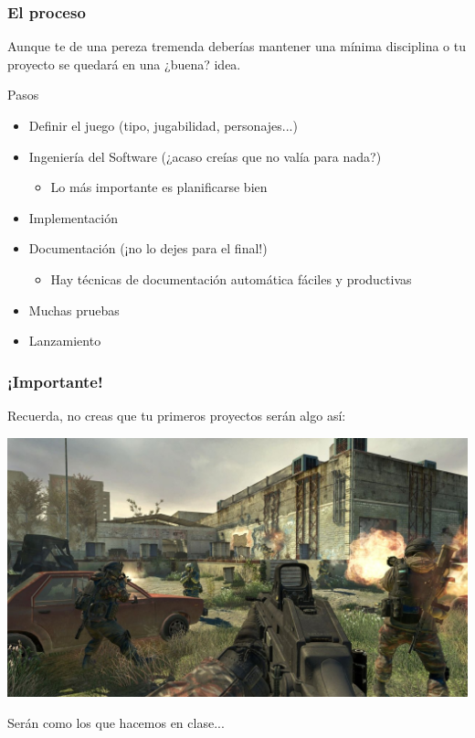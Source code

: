 \begin{frame}
	\frametitle{El proceso}
	
	Aunque te de una pereza tremenda deberías mantener una mínima
	disciplina o tu proyecto se quedará en una ¿buena? idea.
		
	\begin{block}{Pasos}
		\begin{itemize}
			\item Definir el juego (tipo, jugabilidad, personajes...)
			\item Ingeniería del Software (¿acaso creías que no valía para nada?)
			\begin{itemize}
			    \item Lo más importante es planificarse bien
			\end{itemize}
			\item Implementación
			\item Documentación (¡no lo dejes para el final!)
			\begin{itemize}
			    \item Hay técnicas de documentación automática fáciles y productivas
			\end{itemize}
			\item Muchas pruebas
			\item Lanzamiento
		\end{itemize}            
	\end{block}        
	
\end{frame}

\begin{frame}
	\frametitle{¡Importante!}
	
	\begin{center}
		Recuerda, no creas que tu primeros proyectos serán algo así:
	\end{center}	
	
	\begin{center}
		\includegraphics[scale=0.2]{img/codmw2.jpg}
	\end{center}
	
	\begin{center}
		Serán como los que hacemos en clase...
	\end{center}	
\end{frame}


